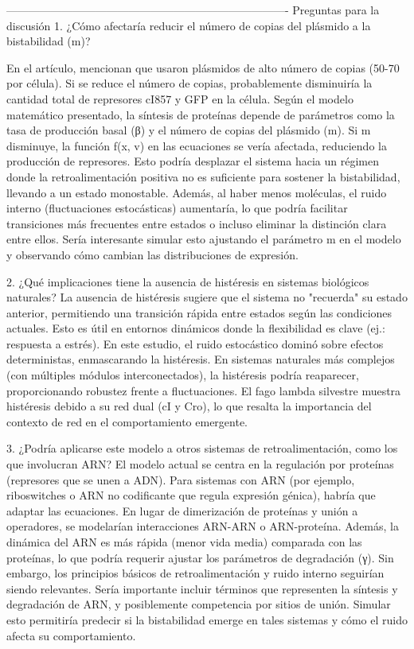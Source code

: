 ----------------------------------------------------------------------------
Preguntas para la discusión 
1.	¿Cómo afectaría reducir el número de copias del plásmido a la bistabilidad (m)?

En el artículo, mencionan que usaron plásmidos de alto número de copias (50-70 por célula). Si se reduce el número de copias, probablemente disminuiría la cantidad total de represores cI857 y GFP en la célula. Según el modelo matemático presentado, la síntesis de proteínas depende de parámetros como la tasa de producción basal (β) y el número de copias del plásmido (m). Si m disminuye, la función f(x, v) en las ecuaciones se vería afectada, reduciendo la producción de represores. Esto podría desplazar el sistema hacia un régimen donde la retroalimentación positiva no es suficiente para sostener la bistabilidad, llevando a un estado monostable. Además, al haber menos moléculas, el ruido interno (fluctuaciones estocásticas) aumentaría, lo que podría facilitar transiciones más frecuentes entre estados o incluso eliminar la distinción clara entre ellos. Sería interesante simular esto ajustando el parámetro m en el modelo y observando cómo cambian las distribuciones de expresión.

2.	¿Qué implicaciones tiene la ausencia de histéresis en sistemas biológicos naturales?
La ausencia de histéresis sugiere que el sistema no "recuerda" su estado anterior, permitiendo una transición rápida entre estados según las condiciones actuales. Esto es útil en entornos dinámicos donde la flexibilidad es clave (ej.: respuesta a estrés).
En este estudio, el ruido estocástico dominó sobre efectos deterministas, enmascarando la histéresis. En sistemas naturales más complejos (con múltiples módulos interconectados), la histéresis podría reaparecer, proporcionando robustez frente a fluctuaciones.
El fago lambda silvestre muestra histéresis debido a su red dual (cI y Cro), lo que resalta la importancia del contexto de red en el comportamiento emergente.

3.	¿Podría aplicarse este modelo a otros sistemas de retroalimentación, como los que involucran ARN?
El modelo actual se centra en la regulación por proteínas (represores que se unen a ADN). Para sistemas con ARN (por ejemplo, riboswitches o ARN no codificante que regula expresión génica), habría que adaptar las ecuaciones. En lugar de dimerización de proteínas y unión a operadores, se modelarían interacciones ARN-ARN o ARN-proteína. Además, la dinámica del ARN es más rápida (menor vida media) comparada con las proteínas, lo que podría requerir ajustar los parámetros de degradación (γ). Sin embargo, los principios básicos de retroalimentación y ruido interno seguirían siendo relevantes. Sería importante incluir términos que representen la síntesis y degradación de ARN, y posiblemente competencia por sitios de unión. Simular esto permitiría predecir si la bistabilidad emerge en tales sistemas y cómo el ruido afecta su comportamiento.


